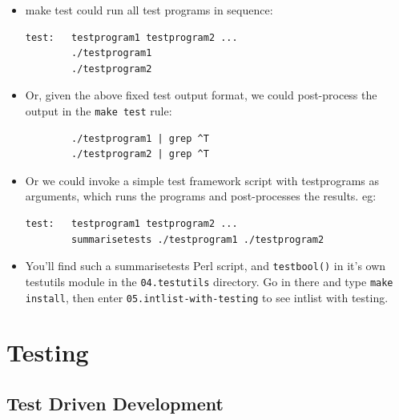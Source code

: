 \documentclass[aspectratio=169]{beamer}
\begin{document}
\begin{frame}[fragile]
    \begin{itemize}
      \item
      \alert{make test} could run all test programs in sequence:
\begin{verbatim}
test:   testprogram1 testprogram2 ...
        ./testprogram1
        ./testprogram2
\end{verbatim}

      \item
      Or, given the above fixed test output format, we could post-process
      the output in the \verb+make test+ rule:
\begin{verbatim}
        ./testprogram1 | grep ^T
        ./testprogram2 | grep ^T
\end{verbatim}

      \item
      Or we could invoke a simple
      test framework script with testprograms as arguments,
      which runs the programs and post-processes the results.  eg:

\begin{verbatim}
test:   testprogram1 testprogram2 ...
        summarisetests ./testprogram1 ./testprogram2
\end{verbatim}

      \item
      You'll find such a \alert{summarisetests} Perl script,
      and \verb+testbool()+ in it's own \alert{testutils} module
      in the \verb+04.testutils+ directory.  Go in there and type
      \verb+make install+, then enter \verb+05.intlist-with-testing+ to see
      \alert{intlist} with testing.

    \end{itemize}
\end{frame}

\section{Testing}
\subsection{Test Driven Development}
\end{document}
